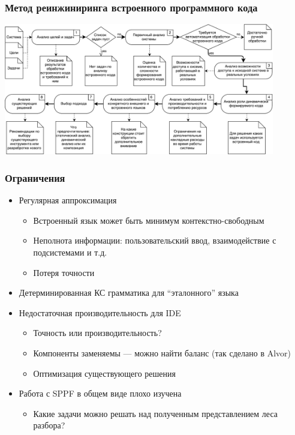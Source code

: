 \documentclass{beamer}
\begin{document}
\begin{frame}[t]
    \transwipe[direction=90]
    \frametitle{Метод реинжиниринга встроенного программного кода}
    \begin{center}
        \includegraphics[width=335pt]{pictures/ActivMethodology.pdf}
    \end{center}
\end{frame}

\begin{frame}[t]
    \transwipe[direction=90]
    \frametitle{Ограничения}
    \begin{itemize}
        \item Регулярная аппроксимация
        \begin{itemize}
          \item Встроенный язык может быть минимум контекстно-свободным
          \item Неполнота информации: пользовательский ввод, взаимодействие с подсистемами и т.д.
          \item Потеря точности
        \end{itemize}
        \item Детерминированная КС грамматика для ``эталонного'' языка 
        \item Недостаточная производительность для IDE
        \begin{itemize}
          \item Точность или производительность?
          \item Компоненты заменяемы --- можно найти баланс (так сделано в Alvor)
          \item Оптимизация существующего решения
        \end{itemize}
        \item Работа с SPPF в общем виде плохо изучена
        \begin{itemize}
          \item Какие задачи можно решать над полученным представлением леса разбора?
        \end{itemize}
    \end{itemize}
\end{frame}
\end{document}
